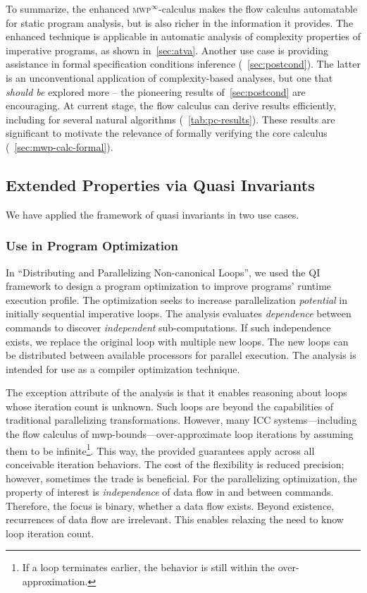 To summarize, the enhanced \textsc{mwp}\(^\infty\)-calculus makes the flow calculus automatable for static program analysis,
but is also richer in the information it provides.
The enhanced technique is applicable in automatic analysis of complexity properties of imperative programs, as shown in~\autoref{sec:atva}.
Another use case is providing assistance in formal specification conditions inference (\cf~\autoref{sec:postcond}).
The latter is an unconventional application of complexity-based analyses, but one that \emph{should be} explored more --
the pioneering results of~\autoref{sec:postcond} are encouraging.
At current stage, the flow calculus can derive results efficiently, including for several natural algorithms (\cf~\autoref{tab:pc-results}).
These results are significant to motivate the relevance of formally verifying the core calculus (\cf~\autoref{sec:mwp-calc-formal}).

\subsection{Extended Properties via Quasi Invariants}
\label{subsec:res-qi}

We have applied the framework of quasi invariants in two use cases.

\subsubsection{Use in Program Optimization}
\label{subsubsec:qi-opt}

In \enquote{Distributing and Parallelizing Non-canonical Loops},
we used the QI framework to design a program optimization to improve programs' runtime execution profile.
The optimization seeks to increase parallelization \emph{potential} in initially sequential imperative loops.
The analysis evaluates \emph{dependence} between commands to discover \emph{independent} sub-computations.
If such independence exists, we replace the original loop with multiple new loops.
The new loops can be distributed between available processors for parallel execution.
The analysis is intended for use as a compiler optimization technique.

The exception attribute of the analysis is that it enables reasoning about
loops whose iteration count is unknown.
Such loops are beyond the capabilities of traditional parallelizing transformations.
However, many ICC systems---including the flow calculus of mwp-bounds---over-approximate loop iterations by assuming them to be infinite\footnote{If a loop terminates earlier, the behavior is still within the over-approximation.}.
This way, the provided guarantees apply across all conceivable iteration behaviors.
The cost of the flexibility is reduced precision;
however, sometimes the trade is beneficial.
For the parallelizing optimization, the property of interest is \emph{independence} of data flow in and between commands.
Therefore, the focus is binary, \ie whether a data flow exists.
Beyond existence, recurrences of data flow are irrelevant.
This enables relaxing the need to know loop iteration count.

